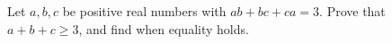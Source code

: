 Let $a,b,c$ be positive real numbers with $ab+bc+ca=3$. Prove that $a+b+c\ge3$, and find when equality holds.
